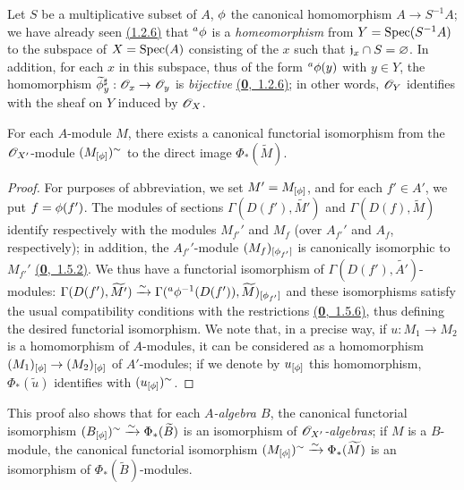 \begin{exm}[1.6.2]
\label{exm-1.1.6.2}
Let $S$ be a multiplicative subset of $A$, $\phi$ the canonical homomorphism $A\to S^{-1}A$;
we have already seen \hyperref[cor-1.1.2.6]{(1.2.6)} that ${}^a\phi$ is a {\it homeomorphism} from
$Y={\mathop{\mathrm{Spec}}\nolimits}(S^{-1}A)$ to the subspace of $X={\mathop{\mathrm{Spec}}\nolimits}(A)$ consisting of the $x$ such that
$\mathfrak{j}_x\cap S=\varnothing$. In addition, for each $x$ in this subspace, thus of the form
${}^a\phi(y)$ with $y\in Y$, the homomorphism $\widetilde{\phi}_y^\sharp:\mathscr{O}_x\to\mathscr{O}_y$ is
{\it bijective} \hyperref[env-0.1.2.6]{(\textbf{0},~1.2.6)}; in other words, $\mathscr{O}_Y$ identifies with the sheaf on $Y$
induced by $\mathscr{O}_X$.
\end{exm}

\begin{prop}[1.6.3]
\label{prop-1.1.6.3}
For each $A$-module $M$, there exists a canonical functorial isomorphism from the
$\mathscr{O}_{X'}$-module $(M_{[\phi]})^\sim$ to the direct image $\Phi_*(\widetilde{M})$.
\end{prop}

\begin{proof}
\label{proof-prop-1.1.6.3}
For purposes of abbreviation, we set $M'=M_{[\phi]}$, and for each $f'\in A'$, we put
$f=\phi(f')$. The modules of sections $\Gamma(D(f'),\widetilde{M'})$ and
$\Gamma(D(f),\widetilde{M})$ identify respectively with the modules $M_{f'}'$ and $M_f$
(over $A_{f'}'$ and $A_f$, respectively); in addition, the $A_{f'}'$-module
$(M_f)_{[\phi_{f'}]}$ is canonically isomorphic to $M_{f'}'$ \hyperref[env-0.1.5.2]{(\textbf{0},~1.5.2)}. We thus have
a functorial isomorphism of $\Gamma(D(f'),\widetilde{A'})$-modules:
$\Gamma(D(f'),\widetilde{M'})
\xrightarrow{\sim}\Gamma({}^a\phi^{-1}(D(f')),\widetilde{M})_{[\phi_{f'}]}$
and these isomorphisms satisfy the usual compatibility conditions with the restrictions
\hyperref[env-0.1.5.6]{(\textbf{0},~1.5.6)}, thus defining the desired functorial isomorphism. We note that, in a
precise way, if $u:M_1\to M_2$ is a homomorphism of $A$-modules, it can be considered as a
homomorphism $(M_1)_{[\phi]}\to(M_2)_{[\phi]}$ of $A'$-modules; if we denote by
$u_{[\phi]}$ this homomorphism, $\Phi_*(\widetilde{u})$ identifies with
$(u_{[\phi]})^\sim$.
\end{proof}

This proof also shows that for each {\it $A$-algebra $B$}, the canonical functorial
isomorphism
$(B_{[\phi]})^\sim\xrightarrow{\sim}\Phi_*(\widetilde{B})$ is an isomorphism of
{\it $\mathscr{O}_{X'}$-algebras}; if $M$ is a $B$-module, the canonical functorial isomorphism
$(M_{[\phi]})^\sim\xrightarrow{\sim}\Phi_*(\widetilde{M})$ is an isomorphism of
$\Phi_*(\widetilde{B})$-modules.


